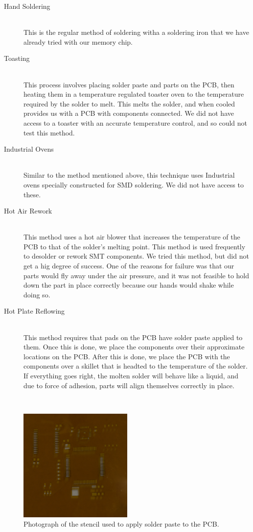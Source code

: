 \begin{description}

	\item[Hand Soldering] \hfill \\
	This is the regular method of soldering witha a soldering iron that we have already tried with our memory chip.
	\item[Toasting] \hfill \\
	This process involves placing solder paste and parts on the PCB,
	then heating them in a temperature regulated toaster oven to the temperature required by the solder to melt.
	This melts the solder, and when cooled provides us with a PCB with components connected.
	We did not have access to a toaster with an accurate temperature control,
	and so could not test this method.
	\item[Industrial Ovens] \hfill \\
	Similar to the method mentioned above,
	this technique uses Industrial ovens specially constructed for SMD soldering.
	We did not have access to these.
	\item[Hot Air Rework] \hfill \\
	This method uses a hot air blower that increases the temperature of the PCB to that of the solder's melting point.
	This method is used frequently to desolder or rework SMT components.
	We tried this method,
	but did not get a hig degree of success.
	One of the reasons for failure was that our parts would fly away under the air pressure,
	and it was not feasible to hold down the part in place correctly because our hands would shake while doing so.
	\item[Hot Plate Reflowing] \hfill \\
	This method requires that pads on the PCB have solder paste applied to them.
	Once this is done,
	we place the components over their approximate locations on the PCB.
	After this is done,
	we place the PCB with the components over a skillet that is headted to the temperature of the solder.
	If everything goes right,
	the molten solder will behave like a liquid,
	and due to force of adhesion,
	parts will align themselves correctly in place.
\end{description}
\hfill \\
\begin{figure}
\begin{center}
\includegraphics[width=0.5\textwidth]{images/stencil.jpg}
\caption{Photograph of the stencil used to apply solder paste to the PCB.}
\label{Fig:Stencil}
\end{center}
\end{figure}
